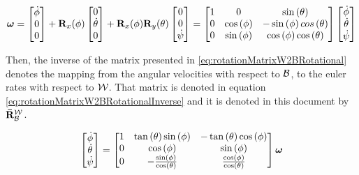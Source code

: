 \begin{equation}
	\bm{\AngVelocity} = \begin{bmatrix}
	\dot{\roll} \\ 0 \\ 0
	\end{bmatrix} + \mathbf{R}_x(\roll) \begin{bmatrix}
	0 \\ \dot{\pitch} \\ 0
	\end{bmatrix} + \mathbf{R}_x(\roll) \mathbf{R}_y(\pitch) \begin{bmatrix}
	0 \\ 0 \\ \dot{\yaw}
	\end{bmatrix} =	\begin{bmatrix}
		1 & 0 & \sin\left(\pitch\right)\\
		0 & \cos\left(\roll\right) & -\sin\left(\roll\right) cos\left(\pitch\right)\\
		0 & \sin\left(\roll\right) & \cos\left(\roll\right)\cos\left(\pitch\right)
	\end{bmatrix} \begin{bmatrix}
	\dot{\roll} \\ \dot{\pitch} \\ \dot{\yaw}
	\end{bmatrix} 
	\label{eq:rotationMatrixW2BRotational}
\end{equation}

Then, the inverse of the matrix presented in \ref{eq:rotationMatrixW2BRotational} denotes the mapping from the angular velocities with respect to $\mathcal{B}$, to the euler rates with respect to $\mathcal{W}$. That matrix is denoted in equation \ref{eq:rotationMatrixW2BRotationalInverse} and it is denoted in this document by $\mathbf{\bar{R}}_{\mathcal{B}}^{\mathcal{W}}$.

\begin{equation}
	\begin{bmatrix}
		\dot{\roll} \\ \dot{\pitch} \\ \dot{\yaw}
	\end{bmatrix} = \begin{bmatrix}
		1 & \tan\left(\pitch\right)\sin\left(\roll\right) & -\tan\left(\pitch\right)\cos\left(\roll\right) \\
		0 & \cos\left(\roll\right) & \sin\left(\roll\right) \\
		0 & -\frac{\sin\left(\roll\right)}{\cos\left(\pitch\right)} & \frac{\cos\left(\roll\right)}{\cos\left(\pitch\right)}
	\end{bmatrix} \bm{\AngVelocity}
	\label{eq:rotationMatrixW2BRotationalInverse}
\end{equation}

